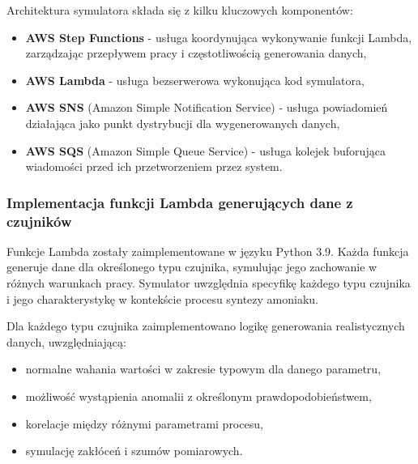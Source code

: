Architektura symulatora składa się z kilku kluczowych komponentów:

\begin{itemize}
    \item \textbf{AWS Step Functions} - usługa koordynująca wykonywanie funkcji Lambda, zarządzając przepływem pracy i częstotliwością generowania danych,
    \item \textbf{AWS Lambda} \cite{aws_lambda_docs} - usługa bezserwerowa wykonująca kod symulatora,
    \item \textbf{AWS SNS} (Amazon Simple Notification Service) \cite{sns_docs} - usługa powiadomień działająca jako punkt dystrybucji dla wygenerowanych danych,
    \item \textbf{AWS SQS} (Amazon Simple Queue Service) \cite{sqs_docs} - usługa kolejek buforująca wiadomości przed ich przetworzeniem przez system.
\end{itemize}

%

\subsubsection{Implementacja funkcji Lambda generujących dane z czujników}
\label{subsubsec:implementacja_lambda}

Funkcje Lambda zostały zaimplementowane w języku Python 3.9. Każda funkcja generuje dane dla określonego typu czujnika,
symulując jego zachowanie w różnych warunkach pracy. Symulator uwzględnia specyfikę każdego typu czujnika i jego charakterystykę w kontekście procesu syntezy amoniaku.

Dla każdego typu czujnika zaimplementowano logikę generowania realistycznych danych, uwzględniającą:
\begin{itemize}
    \item normalne wahania wartości w zakresie typowym dla danego parametru,
    \item możliwość wystąpienia anomalii z określonym prawdopodobieństwem,
    \item korelacje między różnymi parametrami procesu,
    \item symulację zakłóceń i szumów pomiarowych.
\end{itemize}